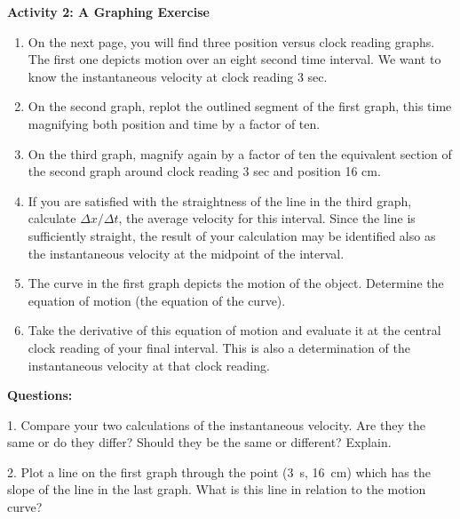 {\noindent \bf Activity 2: A Graphing Exercise} \begin{enumerate}

\item On the next page, you will find three position versus clock reading graphs. The first one depicts motion over an eight second time interval. We want to know the instantaneous velocity at clock reading 3 sec.

\item On the second graph, replot the outlined segment of the first graph, this time magnifying both position and time by a factor of ten.

\item On the third graph, magnify again by a factor of ten the equivalent section of the second graph around clock reading 3 sec and position 16 cm. 

\item If you are satisfied with the straightness of the line in the third graph, calculate $\Delta x/\Delta t$, the average velocity for this interval. Since the line is sufficiently straight, the result of your calculation may be identified also as the instantaneous velocity at the midpoint of the interval.

\item The curve in the first graph depicts the motion of the object. Determine the equation of motion (the equation of the curve).

\item Take the derivative of this equation of motion and evaluate it at the central clock reading of your final interval. This is also a determination of the instantaneous velocity at that clock reading.

\end{enumerate}

\medskip

{\noindent \bf Questions:}

1. Compare your two calculations of the instantaneous velocity. Are they the
same or do they differ? Should they be the same or different? Explain. 
\answerspace{20mm}

2. Plot a line on the first graph through the point (3~s, 16~cm) which has the
slope of the line in the last graph. What is this line in relation to the motion
curve?
\answerspace{20mm}

\pagebreak[2]


